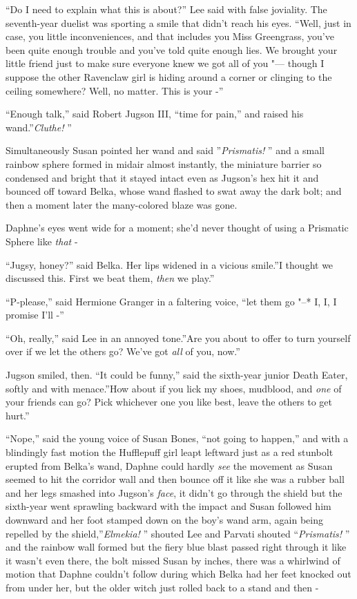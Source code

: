 ``Do I need to explain what this is about?'' Lee said with false
joviality. The seventh-year duelist was sporting a smile that didn't
reach his eyes. ``Well, just in case, you little inconveniences, and
that includes you Miss Greengrass, you've been quite enough trouble and
you've told quite enough lies. We brought your little friend just to
make sure everyone knew we got all of you "--- though I suppose the other
Ravenclaw girl is hiding around a corner or clinging to the ceiling
somewhere? Well, no matter. This is your -''

``Enough talk,'' said Robert Jugson III, ``time for pain,'' and raised
his wand.''\emph{Cluthe!} ''

Simultaneously Susan pointed her wand and said ''\emph{Prismatis!} '' and
a small rainbow sphere formed in midair almost instantly, the miniature
barrier so condensed and bright that it stayed intact even as Jugson's
hex hit it and bounced off toward Belka, whose wand flashed to swat away
the dark bolt; and then a moment later the many-colored blaze was gone.

Daphne's eyes went wide for a moment; she'd never thought of using a
Prismatic Sphere like \emph{that} -

``Jugsy, honey?'' said Belka. Her lips widened in a vicious smile.''I
thought we discussed this. First we beat them, \emph{then} we play.''

``P-please,'' said Hermione Granger in a faltering voice, ``let them go
"--* I, I, I promise I'll -''

``Oh, really,'' said Lee in an annoyed tone.''Are you about to offer to
turn yourself over if we let the others go? We've got \emph{all} of you,
now.''

Jugson smiled, then. ``It could be funny,'' said the sixth-year junior
Death Eater, softly and with menace.''How about if you lick my shoes,
mudblood, and \emph{one} of your friends can go? Pick whichever one you
like best, leave the others to get hurt.''

``Nope,'' said the young voice of Susan Bones, ``not going to happen,''
and with a blindingly fast motion the Hufflepuff girl leapt leftward
just as a red stunbolt erupted from Belka's wand, Daphne could hardly
\emph{see} the movement as Susan seemed to hit the corridor wall and
then bounce off it like she was a rubber ball and her legs smashed into
Jugson's \emph{face}, it didn't go through the shield but the sixth-year
went sprawling backward with the impact and Susan followed him downward
and her foot stamped down on the boy's wand arm, again being repelled by
the shield,''\emph{Elmekia!} '' shouted Lee and Parvati shouted
``\emph{Prismatis!} '' and the rainbow wall formed but the fiery blue
blast passed right through it like it wasn't even there, the bolt missed
Susan by inches, there was a whirlwind of motion that Daphne couldn't
follow during which Belka had her feet knocked out from under her, but
the older witch just rolled back to a stand and then -

